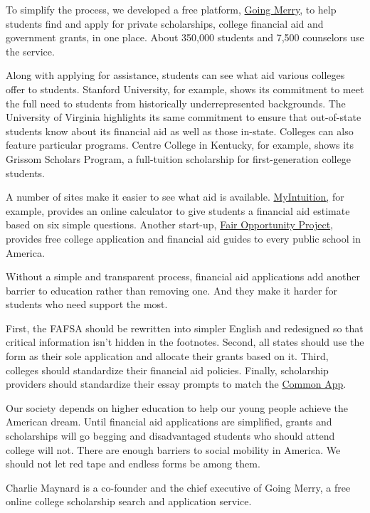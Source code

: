 To simplify the process, we developed a free platform,
\href{https://www.goingmerry.com/}{Going Merry}, to help students find
and apply for private scholarships, college financial aid and government
grants, in one place. About 350,000 students and 7,500 counselors use
the service.

Along with applying for assistance, students can see what aid various
colleges offer to students. Stanford University, for example, shows its
commitment to meet the full need to students from historically
underrepresented backgrounds. The University of Virginia highlights its
same commitment to ensure that out-of-state students know about its
financial aid as well as those in-state. Colleges can also feature
particular programs. Centre College in Kentucky, for example, shows its
Grissom Scholars Program, a full-tuition scholarship for
first-generation college students.

A number of sites make it easier to see what aid is available.
\href{https://myintuition.org/}{MyIntuition,} for example, provides an
online calculator to give students a financial aid estimate based on six
simple questions. Another start-up,
\href{https://www.fairopportunityproject.org/}{Fair Opportunity
Project}, provides free college application and financial aid guides to
every public school in America.

Without a simple and transparent process, financial aid applications add
another barrier to education rather than removing one. And they make it
harder for students who need support the most.

First, the FAFSA should be rewritten into simpler English and redesigned
so that critical information isn't hidden in the footnotes. Second, all
states should use the form as their sole application and allocate their
grants based on it. Third, colleges should standardize their financial
aid policies. Finally, scholarship providers should standardize their
essay prompts to match the \href{https://www.commonapp.org/}{Common
App}.

Our society depends on higher education to help our young people achieve
the American dream. Until financial aid applications are simplified,
grants and scholarships will go begging and disadvantaged students who
should attend college will not. There are enough barriers to social
mobility in America. We should not let red tape and endless forms be
among them.

Charlie Maynard is a co-founder and the chief executive of Going Merry,
a free online college scholarship search and application service.

